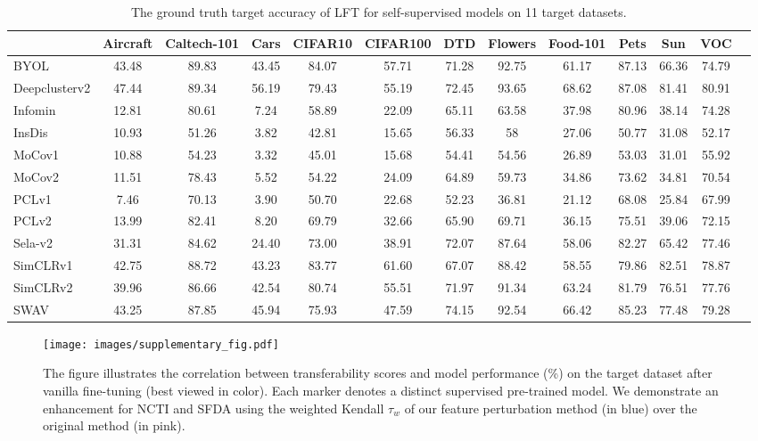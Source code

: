 \begin{table*}\setlength\tabcolsep{5pt}
\footnotesize
    \centering
    \caption{The ground truth target accuracy of LFT for self-supervised models on 11 target datasets.}
    \label{tab:ground_truth-LFT}
    \begin{adjustbox}{max width=\textwidth, margin=0em}
    \begin{tabular}{lcccccccccccc}
        \toprule
        & Aircraft & Caltech-101 & Cars  & CIFAR10 & CIFAR100 & DTD   & Flowers & Food-101 & Pets  & Sun & VOC  \\
        \midrule
        BYOL & 43.48 & 89.83 & 43.45 & 84.07 & 57.71 & 71.28 & 92.75 & 61.17 & 87.13 & 66.36 & 74.79 \\
        Deepclusterv2 & 47.44 & 89.34 & 56.19 & 79.43 & 55.19 & 72.45 & 93.65 & 68.62 & 87.08 & 81.41 & 80.91 \\
        Infomin & 12.81 & 80.61 & 7.24 & 58.89 & 22.09 & 65.11 & 63.58 & 37.98 & 80.96 & 38.14 & 74.28 \\
        InsDis & 10.93 & 51.26 & 3.82 & 42.81 & 15.65 & 56.33 & 58 & 27.06 & 50.77 & 31.08 & 52.17 \\
        MoCov1 & 10.88 & 54.23 & 3.32 & 45.01 & 15.68 & 54.41 & 54.56 & 26.89 & 53.03 & 31.01 & 55.92 \\
        MoCov2 & 11.51 & 78.43 & 5.52 & 54.22 & 24.09 & 64.89 & 59.73 & 34.86 & 73.62 & 34.81 & 70.54 \\
        PCLv1 & 7.46 & 70.13 & 3.90 & 50.70 & 22.68 & 52.23 & 36.81 & 21.12 & 68.08 & 25.84 & 67.99 \\
        PCLv2 & 13.99 & 82.41 & 8.20 & 69.79 & 32.66 & 65.90 & 69.71 & 36.15 & 75.51 & 39.06 & 72.15 \\
        Sela-v2 & 31.31 & 84.62 & 24.40 & 73.00 & 38.91 & 72.07 & 87.64 & 58.06 & 82.27 & 65.42 & 77.46 \\
        SimCLRv1 & 42.75 & 88.72 & 43.23 & 83.77 & 61.60 & 67.07 & 88.42 & 58.55 & 79.86 & 82.51 & 78.87 \\
        SimCLRv2 & 39.96 & 86.66 & 42.54 & 80.74 & 55.51 & 71.97 & 91.34 & 63.24 & 81.79 & 76.51 & 77.76 \\
        SWAV & 43.25 & 87.85 & 45.94 & 75.93 & 47.59 & 74.15 & 92.54 & 66.42 & 85.23 & 77.48 & 79.28 \\
        \bottomrule
    \end{tabular}
\end{adjustbox}

\end{table*}



\begin{figure*}[htbp]
    \centering
    \texttt{[image: images/supplementary\_fig.pdf]}
    \caption{The figure illustrates the correlation between transferability scores and model performance (\%) on the target dataset after vanilla fine-tuning (best viewed in color). Each marker denotes a distinct supervised pre-trained model. We demonstrate an enhancement for NCTI and SFDA using the weighted Kendall $\tau_w$ of our feature perturbation method (in blue) over the original method (in pink).}
    \label{fig:regression plot}
\end{figure*}
